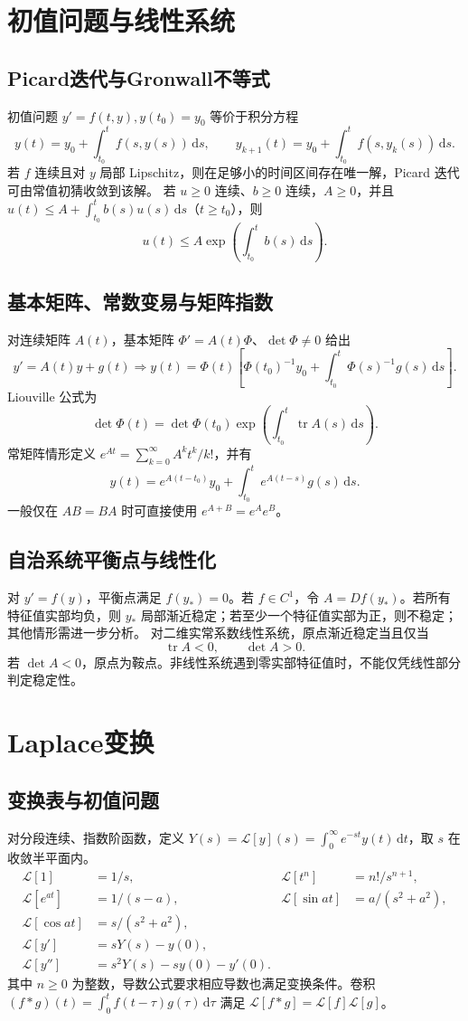 \documentclass[../main.tex]{subfiles}
\begin{document}
\section{初值问题与线性系统}
\subsection{Picard迭代与Gronwall不等式}
初值问题 $y'=f(t,y),y(t_0)=y_0$ 等价于积分方程
\[
y(t)=y_0+\int_{t_0}^tf(s,y(s))\,\mathrm ds,\qquad
y_{k+1}(t)=y_0+\int_{t_0}^tf(s,y_k(s))\,\mathrm ds.
\]
若 $f$ 连续且对 $y$ 局部 Lipschitz，则在足够小的时间区间存在唯一解，Picard 迭代可由常值初猜收敛到该解。
若 $u\ge0$ 连续、$b\ge0$ 连续，$A\ge0$，并且 $u(t)\le A+\int_{t_0}^tb(s)u(s)\,\mathrm ds$（$t\ge t_0$），则
\[
u(t)\le A\exp\!\left(\int_{t_0}^tb(s)\,\mathrm ds\right).
\]
\subsection{基本矩阵、常数变易与矩阵指数}
对连续矩阵 $A(t)$，基本矩阵 $\Phi'=A(t)\Phi$、$\det\Phi\ne0$ 给出
\[
y'=A(t)y+g(t)\Longrightarrow
y(t)=\Phi(t)\left[\Phi(t_0)^{-1}y_0+\int_{t_0}^t\Phi(s)^{-1}g(s)\,\mathrm ds\right].
\]
Liouville 公式为
\[
\det\Phi(t)=\det\Phi(t_0)\exp\!\left(\int_{t_0}^t\operatorname{tr}A(s)\,\mathrm ds\right).
\]
常矩阵情形定义 $e^{At}=\sum_{k=0}^\infty A^kt^k/k!$，并有
\[
y(t)=e^{A(t-t_0)}y_0+\int_{t_0}^te^{A(t-s)}g(s)\,\mathrm ds.
\]
一般仅在 $AB=BA$ 时可直接使用 $e^{A+B}=e^Ae^B$。
\subsection{自治系统平衡点与线性化}
对 $y'=f(y)$，平衡点满足 $f(y_*)=0$。若 $f\in C^1$，令 $A=Df(y_*)$。若所有特征值实部均负，则 $y_*$ 局部渐近稳定；若至少一个特征值实部为正，则不稳定；其他情形需进一步分析。
对二维实常系数线性系统，原点渐近稳定当且仅当
\[
\operatorname{tr}A<0,\qquad \det A>0.
\]
若 $\det A<0$，原点为鞍点。非线性系统遇到零实部特征值时，不能仅凭线性部分判定稳定性。
\section{Laplace变换}
\subsection{变换表与初值问题}
对分段连续、指数阶函数，定义 $Y(s)=\mathcal L[y](s)=\int_0^\infty e^{-st}y(t)\,\mathrm dt$，取 $s$ 在收敛半平面内。
\begin{align*}
\mathcal L[1]&=1/s, &\mathcal L[t^n]&=n!/s^{n+1},\\
\mathcal L[e^{at}]&=1/(s-a), &\mathcal L[\sin at]&=a/(s^2+a^2),\\
\mathcal L[\cos at]&=s/(s^2+a^2),\\
\mathcal L[y']&=sY(s)-y(0),\\
\mathcal L[y'']&=s^2Y(s)-sy(0)-y'(0).
\end{align*}
其中 $n\ge0$ 为整数，导数公式要求相应导数也满足变换条件。卷积 $(f*g)(t)=\int_0^tf(t-\tau)g(\tau)\,\mathrm d\tau$ 满足 $\mathcal L[f*g]=\mathcal L[f]\mathcal L[g]$。
\end{document}
